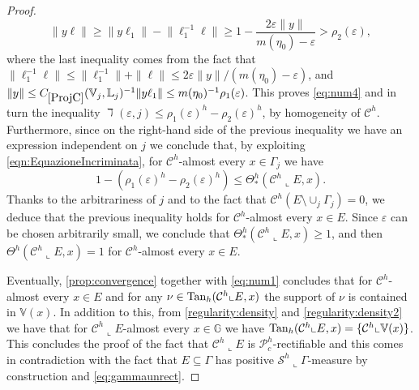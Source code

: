 \documentclass[10pt, a4paper,
oneside, headinclude,footinclude]{scrartcl}
\begin{document}
\begin{proof}
$$\lVert y\ell \rVert\geq \lVert y\ell_1 \rVert-\lVert \ell_1^{-1}\ell \rVert\geq 1-\frac{2\varepsilon\lVert y\rVert}{m(\eta_0)-\varepsilon}>\rho_2(\varepsilon),$$
where the last inequality comes from the fact that $\|\ell_1^{-1}\ell\|\leq \|\ell_1^{-1}\|+\|\ell\|\leq 2\varepsilon\|y\|/(m(\eta_0)-\varepsilon)$, and $\lVert y\rVert\leq \oldC{ProjC}(\mathbb{V}_j,\mathbb{L}_j)^{-1}\lVert y\ell_1\rVert\leq m(\eta_0)^{-1}\rho_1(\varepsilon)$.
This proves \eqref{eq:num4} and in turn the inequality
$\daleth(\varepsilon,j)\leq\rho_1(\varepsilon)^h-\rho_2(\varepsilon)^h$,  by homogeneity of $\mathcal{C}^h$. Furthermore, since on the right-hand side of the previous inequality we have an expression independent on $j$ we conclude that, by exploiting \eqref{eqn:EquazioneIncriminata}, for $\mathcal{C}^h$-almost every $x\in \Gamma_j$ we have
$$1-(\rho_1(\varepsilon)^h-\rho_2(\varepsilon)^h)\leq \Theta^h_*(\mathcal{C}^h\llcorner E,x).$$
Thanks to the arbitrariness of $j$ and to the fact that $\mathcal{C}^h(E\setminus \cup_{j}\Gamma_j)=0$, we deduce that the previous inequality holds for $\mathcal{C}^h$-almost every $x\in E$. Since $\varepsilon$ can be chosen arbitrarily small, we conclude that $\Theta^h_*(\mathcal{C}^h\llcorner E,x)\geq 1$, and then $\Theta^h(\mathcal{C}^h\llcorner E,x)=1$ for $\mathcal{C}^h$-almost every $x\in E$.
\medskip


Eventually, \cref{prop:convergence} together with \eqref{eq:num1} concludes that for $\mathcal{C}^h$-almost every $x\in E$ and for any $\nu\in\mathrm{Tan}_h(\mathcal{C}^h\llcorner E,x)$ the support of $\nu$ is contained in $\mathbb{V}(x)$. In addition to this, from \cref{regularity:density} and \cref{regularity:density2} we have that for $\mathcal{C}^h\llcorner E$-almost every $x\in\mathbb G$ we have $\mathrm{Tan}_h(\mathcal{C}^h\llcorner E,x)=\{\mathcal{C}^h\llcorner \mathbb{V}(x)\}$. This concludes the proof of the fact that $\mathcal{C}^h\llcorner E$ is $\mathscr{P}_c^h$-rectifiable and this comes in contradiction with the fact that $E\subseteq \Gamma$ has positive $\mathcal{S}^h\llcorner\Gamma$-measure by construction and \eqref{eq:gammaunrect}.
\end{proof}


%
%
\end{document}
